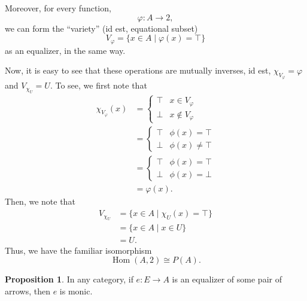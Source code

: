 \documentclass[11pt,leqno,landscape,semhelv]{seminar}
\theoremstyle{definition}
\newtheorem{prop}[thm]{Proposition}
\numberwithin{joke}{section}
\numberwithin{thm}{section}
\numberwithin{equation}{section}
\newcommand{\Hom}{\operatorname{Hom}}
\begin{document}
Moreover, for every function,
\begin{equation*} 
  \varphi:A \to 2,
\end{equation*}
we can form the ``variety'' (id est, equational subset)
\begin{equation*} 
  V_\varphi = \{x \in A \mid \varphi(x) = \top\}
\end{equation*}
as an equalizer, in the same way.

Now, it is easy to see that these operations are mutually inverses, id est, $\chi_{V_{\varphi}} = \varphi$ and $V_{\chi_{U}} = U.$ To see, we first note that
\begin{align*} 
  \chi_{V_{\varphi}}(x) &= \begin{cases}
    \top & x \in V_{\varphi}\\
    \bot & x \notin V_{\varphi}
  \end{cases}\\
  &= \begin{cases}
    \top & \phi(x) = \top\\
    \bot & \phi(x) \neq \top
  \end{cases}\\
  &= \begin{cases}
    \top & \phi(x) = \top\\
    \bot & \phi(x) = \bot
  \end{cases}\\
  &= \varphi(x).
\end{align*}
Then, we note that
\begin{align*} 
  V_{\chi_{U}} &= \{x \in A \mid \chi_U(x) = \top\}\\
  &= \{x \in A \mid x \in U\}\\
  &= U.
\end{align*}
Thus, we have the familiar isomorphism
\begin{equation*} 
  \Hom(A, 2) \cong P(A).
\end{equation*}
\begin{prop} \label{prop:eqmonic}
  In any category, if $e:E\to A$ is an equalizer of some pair of arrows, then $e$ is monic.
\end{prop}
\end{document}
